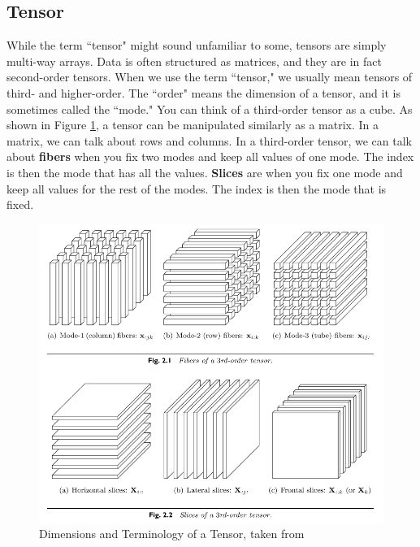 \documentclass[11pt]{article}
\begin{document}
\subsection{Tensor}

While the term ``tensor" might sound unfamiliar to some, tensors are simply multi-way arrays. Data is often structured as matrices, and they are in fact second-order tensors. When we use the term ``tensor," we usually mean tensors of third- and higher-order. The ``order" means the dimension of a tensor, and it is sometimes called the ``mode." You can think of a third-order tensor as a cube. As shown in Figure \ref{fig:tensor}, a tensor can be manipulated similarly as a matrix. In a matrix, we can talk about rows and columns. In a third-order tensor, we can talk about \textbf{fibers} when you fix two modes and keep all values of one mode. The index is then the mode that has all the values. \textbf{Slices} are when you fix one mode and keep all values for the rest of the modes. The index is then the mode that is fixed.

\begin{figure}[H]
    \centering
    \includegraphics[width = 10 cm]{tensor.png}
    \caption{Dimensions and Terminology of a Tensor, taken from \cite{kolda2009review}}
    \label{fig:tensor}
\end{figure}
\end{document}
